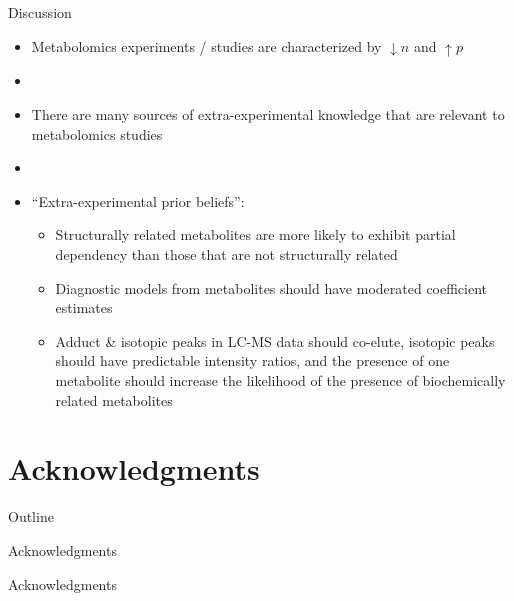 \documentclass[xcolor=dvipsnames]{beamer}
\begin{document}
\begin{frame}{Discussion}
	\vspace{-10.5pt}
	\begin{itemize}
		\item Metabolomics experiments / studies are characterized by $\downarrow n$ and $\uparrow p$
		\item[]
		\item There are many sources of extra-experimental knowledge that are relevant to metabolomics studies 
		\item[] 
		\item ``Extra-experimental prior beliefs'':
		\begin{itemize}
			\item Structurally related metabolites are more likely to exhibit partial dependency than those that are not structurally related
			\item Diagnostic models from metabolites should have moderated coefficient estimates
			\item Adduct \& isotopic peaks in LC-MS data should co-elute, isotopic peaks should have predictable intensity ratios, and the presence of one metabolite should increase the likelihood of the presence of biochemically related metabolites
		\end{itemize}
	\end{itemize}
\end{frame}

\section{Acknowledgments}
\begin{frame}{Outline}
	\vspace{-10.5pt}
	\tableofcontents[currentsection,subsectionstyle=hide]
\end{frame}

\begin{frame}{Acknowledgments}
	\vspace{-5.5pt}
	\begin{center}
	\end{center}
\end{frame}

\begin{frame}{Acknowledgments}
	\vspace{-5.5pt}
	\begin{center}
	\end{center}
\end{frame}
\end{document}
